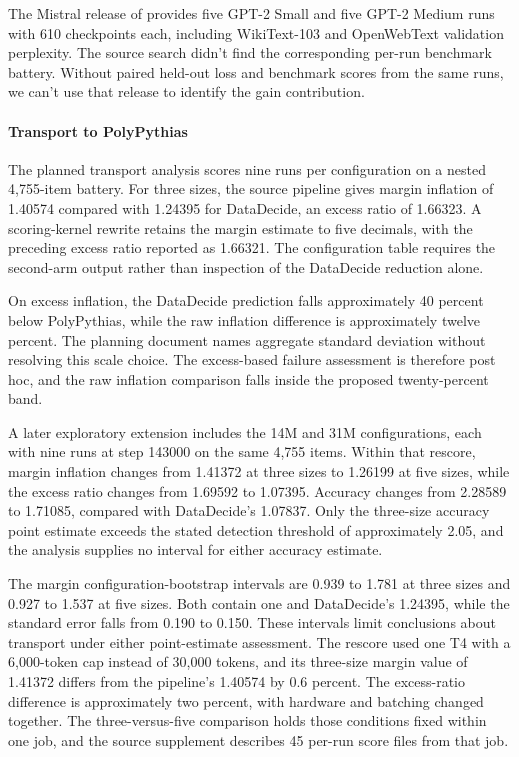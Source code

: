 The Mistral release of \citet{karamcheti2021} provides five GPT-2 Small and five GPT-2 Medium runs with 610 checkpoints each, including WikiText-103 and OpenWebText validation perplexity. The source search didn't find the corresponding per-run benchmark battery. Without paired held-out loss and benchmark scores from the same runs, we can't use that release to identify the gain contribution.

\paragraph{Transport to PolyPythias}
The planned transport analysis scores nine runs per configuration on a nested 4,755-item battery. For three sizes, the source pipeline gives margin inflation of 1.40574 compared with 1.24395 for DataDecide, an excess ratio of 1.66323. A scoring-kernel rewrite retains the margin estimate to five decimals, with the preceding excess ratio reported as 1.66321. The configuration table requires the second-arm output rather than inspection of the DataDecide reduction alone.

On excess inflation, the DataDecide prediction falls approximately 40 percent below PolyPythias, while the raw inflation difference is approximately twelve percent. The planning document names aggregate standard deviation without resolving this scale choice. The excess-based failure assessment is therefore post hoc, and the raw inflation comparison falls inside the proposed twenty-percent band.

A later exploratory extension includes the 14M and 31M configurations, each with nine runs at step 143000 on the same 4,755 items. Within that rescore, margin inflation changes from 1.41372 at three sizes to 1.26199 at five sizes, while the excess ratio changes from 1.69592 to 1.07395. Accuracy changes from 2.28589 to 1.71085, compared with DataDecide's 1.07837. Only the three-size accuracy point estimate exceeds the stated detection threshold of approximately 2.05, and the analysis supplies no interval for either accuracy estimate.

The margin configuration-bootstrap intervals are 0.939 to 1.781 at three sizes and 0.927 to 1.537 at five sizes. Both contain one and DataDecide's 1.24395, while the standard error falls from 0.190 to 0.150. These intervals limit conclusions about transport under either point-estimate assessment. The rescore used one T4 with a 6,000-token cap instead of 30,000 tokens, and its three-size margin value of 1.41372 differs from the pipeline's 1.40574 by 0.6 percent. The excess-ratio difference is approximately two percent, with hardware and batching changed together. The three-versus-five comparison holds those conditions fixed within one job, and the source supplement describes 45 per-run score files from that job.

